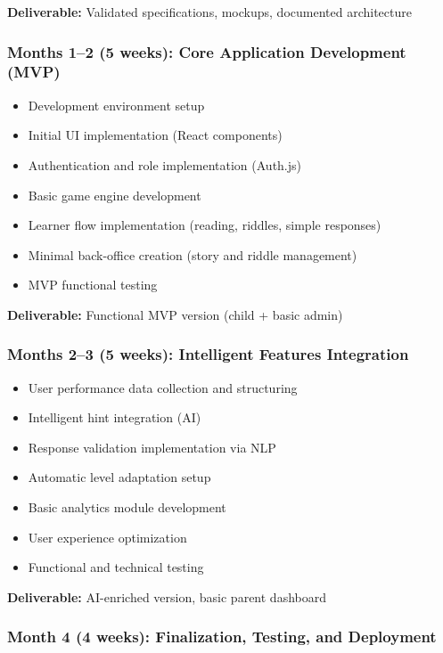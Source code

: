 \documentclass[12pt,a4paper]{article}
\begin{document}
\textbf{Deliverable:} Validated specifications, mockups, documented architecture

\subsubsection{Months 1--2 (5 weeks): Core Application Development (MVP)}

\begin{itemize}
    \item Development environment setup
    \item Initial UI implementation (React components)
    \item Authentication and role implementation (Auth.js)
    \item Basic game engine development
    \item Learner flow implementation (reading, riddles, simple responses)
    \item Minimal back-office creation (story and riddle management)
    \item MVP functional testing
\end{itemize}

\textbf{Deliverable:} Functional MVP version (child + basic admin)

\subsubsection{Months 2--3 (5 weeks): Intelligent Features Integration}

\begin{itemize}
    \item User performance data collection and structuring
    \item Intelligent hint integration (AI)
    \item Response validation implementation via NLP
    \item Automatic level adaptation setup
    \item Basic analytics module development
    \item User experience optimization
    \item Functional and technical testing
\end{itemize}

\textbf{Deliverable:} AI-enriched version, basic parent dashboard

\subsubsection{Month 4 (4 weeks): Finalization, Testing, and Deployment}
\end{document}
